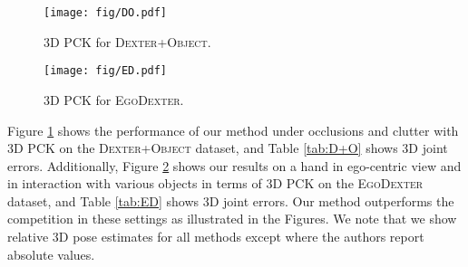 \documentclass[10pt,twocolumn,letterpaper]{article}
\begin{document}
 


 
 

 
\begin{figure}[h!]
\center
\texttt{[image: fig/DO.pdf]}
\vspace{-8pt}
\caption{3D PCK for \textsc{Dexter+Object}.}
\label{fig:pck_DO}
\end{figure}

\vspace{-5pt}
\begin{table}[h!]
\center
{}
\vspace{-5pt}
\caption{Average 3D joint distance (mm) to ground-truth for \textsc{Dexter+Object}.}
\label{tab:D+O}
\end{table}

\begin{figure}[h!]
\center
\texttt{[image: fig/ED.pdf]}
\vspace{-8pt}
\caption{3D PCK for \textsc{EgoDexter}.}
\label{fig:pck_ED}
\end{figure}
 
\begin{table}[h!]
\center
{}
\vspace{-5pt}
\caption{Average 3D joint distance (mm) to ground-truth for \textsc{EgoDexter}.}
\label{tab:ED}
\end{table} 
 
Figure \ref{fig:pck_DO} shows the performance of our method under occlusions and clutter with 3D PCK on the \textsc{Dexter+Object} dataset, and Table \ref{tab:D+O} shows 3D joint errors. Additionally, Figure \ref{fig:pck_ED} shows our results on a hand in ego-centric view and in interaction with various objects in terms of 3D PCK on the \textsc{EgoDexter} dataset, and Table \ref{tab:ED} shows 3D joint errors. Our method outperforms the competition in these settings as  illustrated in the Figures. We note that we show relative 3D pose estimates for all methods except \cite{iqbal2018hand} where the authors report absolute values.
\end{document}
